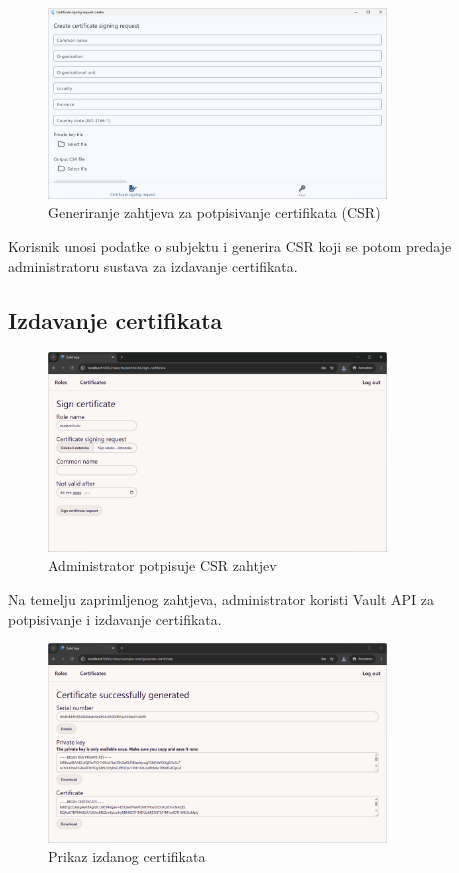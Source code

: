 \documentclass[]{foi}
\begin{document}
\begin{figure}[H]
    \centering
    \includegraphics[width=0.8\textwidth]{assets/csr.png}
    \caption{Generiranje zahtjeva za potpisivanje certifikata (CSR)}
\end{figure}

Korisnik unosi podatke o subjektu i generira CSR koji se potom predaje administratoru sustava za izdavanje certifikata.

\subsection{Izdavanje certifikata}

\begin{figure}[H]
    \centering
    \includegraphics[width=0.8\textwidth]{assets/sign-certificate.png}
    \caption{Administrator potpisuje CSR zahtjev}
\end{figure}

Na temelju zaprimljenog zahtjeva, administrator koristi Vault API za potpisivanje i izdavanje certifikata.

\begin{figure}[H]
    \centering
    \includegraphics[width=0.8\textwidth]{assets/generated-certificate.png}
    \caption{Prikaz izdanog certifikata}
\end{figure}
\end{document}
